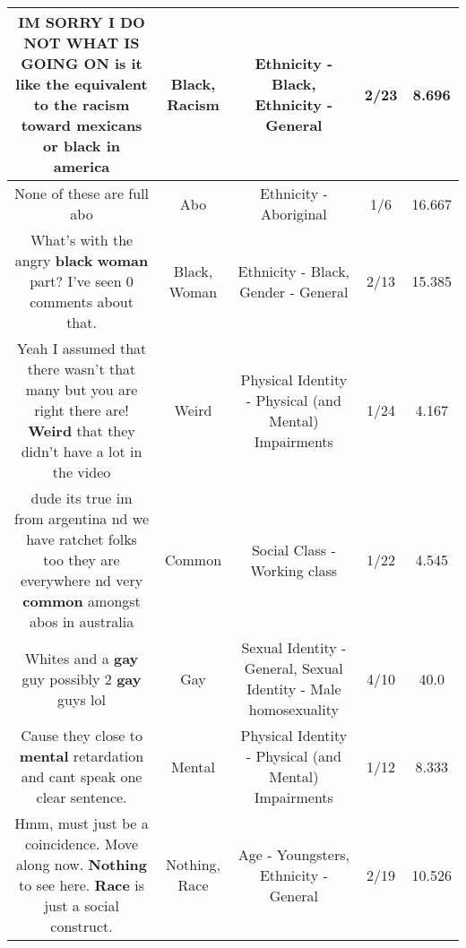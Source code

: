\documentclass[11pt]{article}
\newlength\mylength
\begin{document}
\begin{center}
\begin{longtable}{|C{.65\mylength}|C{.30\mylength}|C{.12\mylength}|C{.12\mylength}|C{.12\mylength}|}
  \small IM SORRY I DO NOT WHAT IS GOING ON is it like the equivalent to the \textbf{racism} toward mexicans or \textbf{black} in america\normalsize   & Black, Racism & Ethnicity - Black, Ethnicity - General & 2/23 & 8.696 \\  \hline
  \small None of these are full abo\normalsize   & Abo & Ethnicity - Aboriginal & 1/6 & 16.667 \\  \hline
  \small What's with the angry \textbf{black} \textbf{woman} part? I've seen 0 comments about that.\normalsize   & Black, Woman & Ethnicity - Black, Gender - General & 2/13 & 15.385 \\  \hline
  \small Yeah I assumed that there wasn't that many but you are right there are! \textbf{Weird} that they didn't have a lot in the video\normalsize   & Weird & Physical Identity - Physical (and Mental) Impairments & 1/24 & 4.167 \\  \hline
  \small dude its true im from argentina nd we have ratchet folks too they are everywhere nd very \textbf{common} amongst abos in australia\normalsize   & Common & Social Class - Working class & 1/22 & 4.545 \\  \hline
  \small Whites and a \textbf{g\textbf{ay}} guy possibly 2 \textbf{g\textbf{ay}} guys lol\normalsize   & Gay & Sexual Identity - General, Sexual Identity - Male homosexuality & 4/10 & 40.0 \\  \hline
  \small Cause they close to \textbf{mental} retardation and cant speak one clear sentence.\normalsize   & Mental & Physical Identity - Physical (and Mental) Impairments & 1/12 & 8.333 \\  \hline
  \small Hmm, must just be a coincidence. Move along now. \textbf{Nothing} to see here. \textbf{Race} is just a social construct.\normalsize   & Nothing, Race & Age - Youngsters, Ethnicity - General & 2/19 & 10.526 \\  \hline

\end{longtable}
\end{center}
\end{document}
